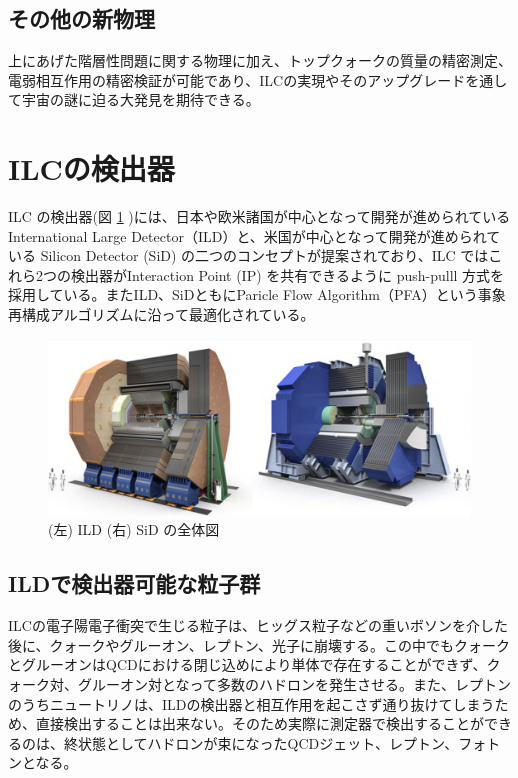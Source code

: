 \subsection{その他の新物理}
上にあげた階層性問題に関する物理に加え、トップクォークの質量の精密測定、電弱相互作用の精密検証が可能であり、ILCの実現やそのアップグレードを通して宇宙の謎に迫る大発見を期待できる。
\section{ILCの検出器}
ILC の検出器(図 \ref{ilcdetector} )には、日本や欧米諸国が中心となって開発が進められている International Large Detector（ILD）と、米国が中心となって開発が進められている Silicon Detector (SiD) の二つのコンセプトが提案されており、ILC ではこれら2つの検出器がInteraction Point (IP) を共有できるように push-pulll 方式を採用している。またILD、SiDともにParicle Flow Algorithm（PFA）という事象再構成アルゴリズムに沿って最適化されている。
\begin{figure}[h]
	\begin{center}
        \includegraphics[keepaspectratio, scale=0.4]
 	{Figure/Introduction/detector.png}
 		\caption{(左) ILD (右) SiD の全体図}
 		\label{ilcdetector}
	\end{center}
\end{figure}
\subsection{ILDで検出器可能な粒子群}
ILCの電子陽電子衝突で生じる粒子は、ヒッグス粒子などの重いボソンを介した後に、クォークやグルーオン、レプトン、光子に崩壊する。この中でもクォークとグルーオンはQCDにおける閉じ込めにより単体で存在することができず、クォーク対、グルーオン対となって多数のハドロンを発生させる。また、レプトンのうちニュートリノは、ILDの検出器と相互作用を起こさず通り抜けてしまうため、直接検出することは出来ない。そのため実際に測定器で検出することができるのは、終状態としてハドロンが束になったQCDジェット、レプトン、フォトンとなる。
